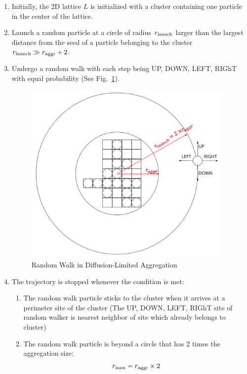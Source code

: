 \documentclass[aps,preprint,groupedaddress,letterpaper]{revtex4-1}
\begin{document}
\begin{enumerate}
    \item Initially, the 2D lattice $L$ is initialized with a cluster containing one particle in the center of the lattice.
    \item Launch a random particle at a circle of radius $r_{\rm launch}$ larger than the largest distance from the seed of a particle belonging to the cluster $r_{\rm launch} \gg r_{\rm aggr}+ 2$.
    \item Undergo a random walk with each step being UP, DOWN, LEFT, RIGhT with equal probability \cite{doi:10.1063} (See Fig.~\ref{random_walk}).
    
    \begin{figure}[h]
    \centering
    \includegraphics[width=4.0in]{img/RandomWalk.png}
    \caption{Random Walk in Diffusion-Limited Aggregation
    \label{random_walk}}
    \end{figure}
    
    \item The trajectory is stopped whenever the condition is met:
    \begin{enumerate}
        \item The random walk particle sticks to the cluster when it arrives at a perimeter site of the cluster (The UP, DOWN, LEFT, RIGhT site of random walker is nearest neighbor of site which already belongs to cluster) 
        \item The random walk particle is beyond a circle that has 2 times the aggregation size:
        \begin{equation}
            r_{\rm max} = r_{\rm aggr} \times 2
        \end{equation}
    \end{enumerate}
    

\end{enumerate}
\end{document}
